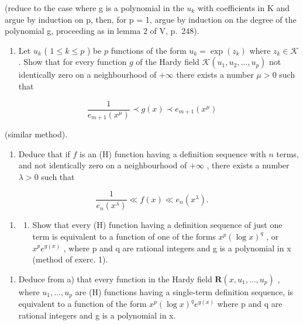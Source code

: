 (reduce to the case where g is a polynomial in the \(u_{k}\) with coefficients in K and argue by induction on p, then, for p = 1, argue by induction on the degree of the polynomial g, proceeding as in lemma 2 of V, p.~248).

\begin{enumerate}
\def\labelenumi{\alph{enumi})}
\setcounter{enumi}{1}
\tightlist
\item
  Let \(u_{k}\) ( \(1 \leqslant k \leqslant p\) ) be \(p\) functions of the form \(u_{k} = \exp(z_{k})\) where \(z_{k} \in \mathcal{K}\) . Show that for every function \(g\) of the Hardy field \(\mathcal{K}(u_{1}, u_{2}, \ldots, u_{p})\) not identically zero on a neighbourhood of \(+\infty\) there exists a number \(\mu > 0\) such that
\end{enumerate}

\[
\frac {1}{e _ {m + 1} (x ^ {\mu})} \prec g (x) \prec e _ {m + 1} (x ^ {\mu})
\]

(similar method).

\begin{enumerate}
\def\labelenumi{\alph{enumi})}
\setcounter{enumi}{2}
\tightlist
\item
  Deduce that if \(f\) is an (H) function having a definition sequence with \(n\) terms, and not identically zero on a neighbourhood of \(+\infty\) , there exists a number \(\lambda > 0\) such that
\end{enumerate}

\[
\frac {1}{e _ {n} (x ^ {\lambda})} \ll f (x) \ll e _ {n} (x ^ {\lambda}).
\]

\begin{enumerate}
\def\labelenumi{\arabic{enumi})}
\setcounter{enumi}{1}
\tightlist
\item
  \begin{enumerate}
  \def\labelenumii{\alph{enumii})}
  \tightlist
  \item
    Show that every (H) function having a definition sequence of just one term is equivalent to a function of one of the forms \(x^{p}(\log x)^{q}\) , or \(x^{p}e^{g(x)}\) , where p and q are rational integers and g is a polynomial in x (method of exerc. 1).
  \end{enumerate}
\end{enumerate}

\begin{enumerate}
\def\labelenumi{\alph{enumi})}
\setcounter{enumi}{1}
\tightlist
\item
  Deduce from a) that every function in the Hardy field \(\mathbf{R}(x,u_{1},\ldots,u_{p})\) , where \(u_{1},\ldots,u_{p}\) are (H) functions having a single-term definition sequence, is equivalent to a function of the form \(x^{p}(\log x)^{q}e^{g(x)}\) where p and q are rational integers and g is a polynomial in x.
\end{enumerate}

